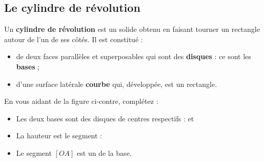 \documentclass[a4paper]{book}
\begin{document}
\subsection{Le cylindre de révolution}
    \begin{definition}
        Un \textbf{cylindre de révolution} est un solide obtenu en faisant tourner un rectangle autour de l'un de ses côtés. Il est constitué :
        \begin{itemize}
            \item de deux faces parallèles et superposables qui sont des \textbf{disques} : ce sont les \textbf{bases} ;
            \item d'une surface latérale \textbf{courbe} qui, développée, est un rectangle.
        \end{itemize}
    \end{definition}

    \noindent
    \begin{minipage}{0.55\textwidth}
        \begin{exemple}
        En vous aidant de la figure ci-contre, complétez :
        \begin{itemize}
            \item Les deux bases sont des disques de centres respectifs : \points[4] et \points[4]
            \item La hauteur est le segment : \points[6]
            \item Le segment $[OA]$ est un \points[6] de la base.
        \end{itemize}
        \end{exemple}
    \end{minipage}
    \hfill
    \begin{minipage}{0.4\textwidth}
    \centering
    \end{minipage}
\end{document}
